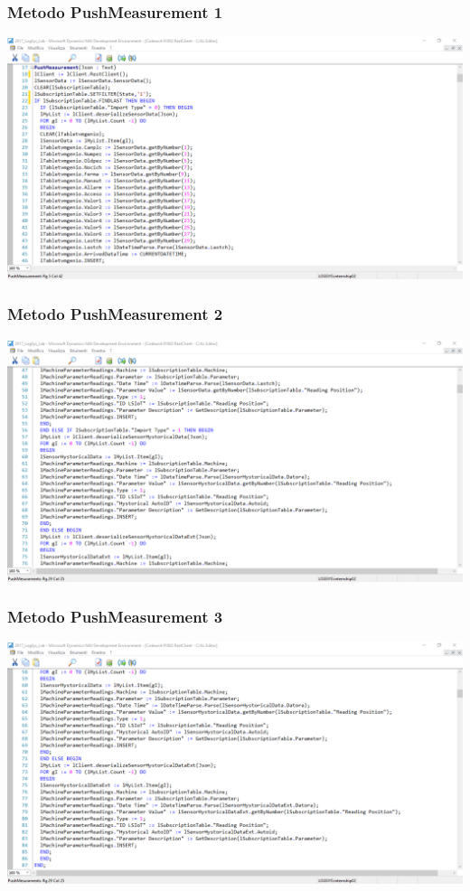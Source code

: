 \documentclass{beamer}
\begin{document}
\begin{frame}
\frametitle{Metodo PushMeasurement 1}
\includegraphics[width=1\textwidth]{images/NAVPushMeasuraments1.png}
\end{frame}

\begin{frame}
\frametitle{Metodo PushMeasurement 2}
\includegraphics[width=1\textwidth]{images/NAVPushMeasuraments2.png}
\end{frame}

\begin{frame}
\frametitle{Metodo PushMeasurement 3}
\includegraphics[width=1\textwidth]{images/NAVPushMeasuraments3.png}
\end{frame}
\end{document}
